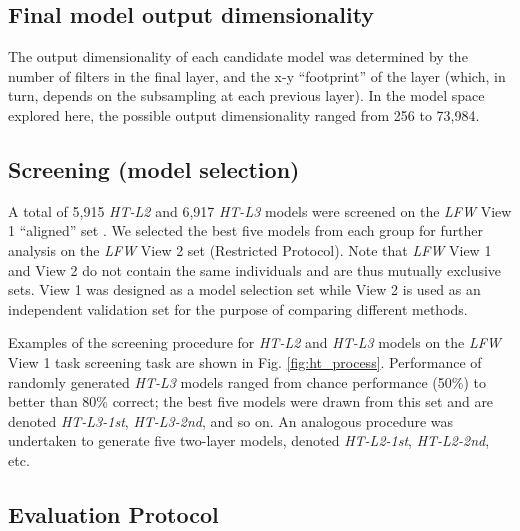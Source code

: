 \subsection{Final model output dimensionality}
\label{sec:final_dim}

The output dimensionality of each candidate model was determined by the number
of filters in the final layer, and the x-y ``footprint'' of the layer (which, in
turn, depends on the subsampling at each previous layer).  In the model space
explored here, the possible output dimensionality ranged from 256 to 73,984.


\subsection{Screening (model selection)}

A total of 5,915 \emph{HT-L2} and 6,917 \emph{HT-L3} models were screened on the \emph{LFW}
View 1 ``aligned'' set \cite{taigman:bmvc09}.  We selected the best five models
from each group for further analysis on the \emph{LFW} View 2 set (Restricted
Protocol).  Note that \emph{LFW} View 1 and View 2 do not contain the same
individuals and are thus mutually exclusive sets. View 1 was designed as a model
selection set while View 2 is used as an independent validation set for the
purpose of comparing different methods.

Examples of the screening procedure for \emph{HT-L2} and \emph{HT-L3} models on the
\emph{LFW} View 1 task screening task are shown in Fig. \ref{fig:ht_process}.
Performance of randomly generated \emph{HT-L3} models ranged from chance performance
(50\%) to better than 80\% correct; the best five models were drawn from this
set and are denoted \emph{HT-L3-1st}, \emph{HT-L3-2nd}, and so on.  An analogous
procedure was undertaken to generate five two-layer models, denoted
\emph{HT-L2-1st}, \emph{HT-L2-2nd}, etc.



\subsection{Evaluation Protocol}

